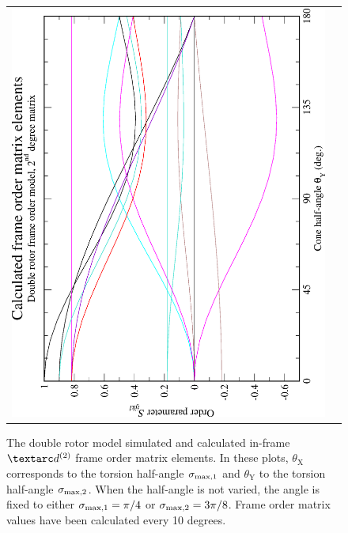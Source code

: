\begin{figure}
\begin{tabular}{@{}cc@{}}
    \includegraphics[width=.35\textwidth,angle=270]{images/frame_order_matrix/Sijkl_double_rotor_in_frame_theta_y_calc.eps} \\
  \end{tabular}
  \caption[Double rotor simulated and calculated in-frame $\FOtwo$ elements.]{
    The double rotor model simulated and calculated in-frame $\FOtwo$ frame order matrix elements.
    In these plots, $\theta_\textrm{X}$ corresponds to the torsion half-angle $\sigma_{\textrm{max,1}}$ and $\theta_\textrm{Y}$ to the torsion half-angle $\sigma_{\textrm{max,2}}$.
    When the half-angle is not varied, the angle is fixed to either $\sigma_{\textrm{max,1}} = \pi/4$ or $\sigma_{\textrm{max,2}} = 3\pi/8$.
    Frame order matrix values have been calculated every 10 degrees.
  }
  \label{fig: simulated and calculated in-frame 2nd degree double rotor frame order}
\end{figure}

